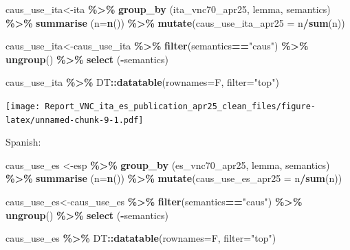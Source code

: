 \documentclass[
]{article}
\newenvironment{Shaded}{\begin{snugshade}}{\end{snugshade}}
\newcommand{\AttributeTok}[1]{\textcolor[rgb]{0.13,0.29,0.53}{#1}}
\newcommand{\FunctionTok}[1]{\textcolor[rgb]{0.13,0.29,0.53}{\textbf{#1}}}
\newcommand{\NormalTok}[1]{#1}
\newcommand{\OtherTok}[1]{\textcolor[rgb]{0.56,0.35,0.01}{#1}}
\newcommand{\SpecialCharTok}[1]{\textcolor[rgb]{0.81,0.36,0.00}{\textbf{#1}}}
\newcommand{\StringTok}[1]{\textcolor[rgb]{0.31,0.60,0.02}{#1}}
\begin{document}
\begin{Shaded}
\begin{Highlighting}[]
\NormalTok{caus\_use\_ita}\OtherTok{\textless{}{-}}\NormalTok{ita }\SpecialCharTok{\%\textgreater{}\%}
  \FunctionTok{group\_by}\NormalTok{ (ita\_vnc70\_apr25, lemma, semantics) }\SpecialCharTok{\%\textgreater{}\%}
  \FunctionTok{summarise}\NormalTok{ (}\AttributeTok{n=}\FunctionTok{n}\NormalTok{()) }\SpecialCharTok{\%\textgreater{}\%}
  \FunctionTok{mutate}\NormalTok{(}\AttributeTok{caus\_use\_ita\_apr25 =}\NormalTok{ n}\SpecialCharTok{/}\FunctionTok{sum}\NormalTok{(n))}


\NormalTok{caus\_use\_ita}\OtherTok{\textless{}{-}}\NormalTok{caus\_use\_ita }\SpecialCharTok{\%\textgreater{}\%} \FunctionTok{filter}\NormalTok{(semantics}\SpecialCharTok{==}\StringTok{"caus"}\NormalTok{) }\SpecialCharTok{\%\textgreater{}\%} \FunctionTok{ungroup}\NormalTok{() }\SpecialCharTok{\%\textgreater{}\%} \FunctionTok{select}\NormalTok{ (}\SpecialCharTok{{-}}\NormalTok{semantics)}

\NormalTok{caus\_use\_ita }\SpecialCharTok{\%\textgreater{}\%}\NormalTok{ DT}\SpecialCharTok{::}\FunctionTok{datatable}\NormalTok{(}\AttributeTok{rownames=}\NormalTok{F, }\AttributeTok{filter=}\StringTok{"top"}\NormalTok{)}
\end{Highlighting}
\end{Shaded}

\texttt{[image: Report\_VNC\_ita\_es\_publication\_apr25\_clean\_files/figure-latex/unnamed-chunk-9-1.pdf]}

Spanish:

\begin{Shaded}
\begin{Highlighting}[]
\NormalTok{caus\_use\_es }\OtherTok{\textless{}{-}}\NormalTok{esp }\SpecialCharTok{\%\textgreater{}\%}
  \FunctionTok{group\_by}\NormalTok{ (es\_vnc70\_apr25, lemma, semantics) }\SpecialCharTok{\%\textgreater{}\%}
  \FunctionTok{summarise}\NormalTok{ (}\AttributeTok{n=}\FunctionTok{n}\NormalTok{()) }\SpecialCharTok{\%\textgreater{}\%}
  \FunctionTok{mutate}\NormalTok{(}\AttributeTok{caus\_use\_es\_apr25 =}\NormalTok{ n}\SpecialCharTok{/}\FunctionTok{sum}\NormalTok{(n))}


\NormalTok{caus\_use\_es}\OtherTok{\textless{}{-}}\NormalTok{caus\_use\_es }\SpecialCharTok{\%\textgreater{}\%} \FunctionTok{filter}\NormalTok{(semantics}\SpecialCharTok{==}\StringTok{"caus"}\NormalTok{) }\SpecialCharTok{\%\textgreater{}\%} \FunctionTok{ungroup}\NormalTok{() }\SpecialCharTok{\%\textgreater{}\%} \FunctionTok{select}\NormalTok{ (}\SpecialCharTok{{-}}\NormalTok{semantics)}

\NormalTok{caus\_use\_es }\SpecialCharTok{\%\textgreater{}\%}\NormalTok{ DT}\SpecialCharTok{::}\FunctionTok{datatable}\NormalTok{(}\AttributeTok{rownames=}\NormalTok{F, }\AttributeTok{filter=}\StringTok{"top"}\NormalTok{)}
\end{Highlighting}
\end{Shaded}
\end{document}
